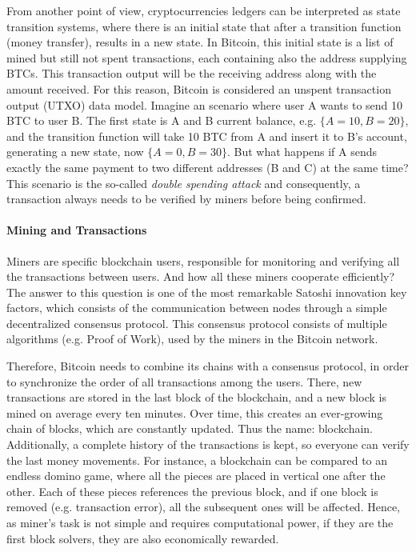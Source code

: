 From another point of view, cryptocurrencies ledgers can be interpreted as state transition systems, where there is an initial state that after a transition function (money transfer), results in a new state. In Bitcoin, this initial state is a list of mined but still not spent transactions, each containing also the address supplying BTCs. This transaction output will be the receiving address along with the amount received. For this reason, Bitcoin is considered an unspent transaction output (UTXO) data model. Imagine an scenario where user A wants to send 10 BTC to user B. The first state is A and B current balance, e.g. $\{A = 10, B = 20\}$, and the transition function will take 10 BTC from A and insert it to B's account, generating a new state, now $\{A = 0, B = 30\}$. But what happens if A sends exactly the same payment to two different addresses (B and C) at the same time? This scenario is the so-called \textit{double spending attack} and consequently, a transaction always needs to be verified by miners before being confirmed. 

\paragraph{Mining and Transactions}

Miners are specific blockchain users, responsible for monitoring and verifying all the transactions between users. And how all these miners cooperate efficiently? The answer to this question is one of the most remarkable Satoshi innovation key factors, which consists of the communication between nodes through a simple decentralized consensus protocol. This consensus protocol consists of multiple algorithms (e.g. Proof of Work), used by the miners in the Bitcoin network.

Therefore, Bitcoin needs to combine its chains with a consensus protocol, in order to synchronize the order of all transactions among the users. There, new transactions are stored in the last block of the blockchain, and a new block is mined on average every ten minutes. Over time, this creates an ever-growing chain of blocks, which are constantly updated. Thus the name: blockchain. Additionally, a complete history of the transactions is kept, so everyone can verify the last money movements. For instance, a blockchain can be compared to an endless domino game, where all the pieces are placed in vertical one after the other. Each of these pieces references the previous block, and if one block is removed (e.g. transaction error), all the subsequent ones will be affected. Hence, as miner's task is not simple and requires computational power, if they are the first block solvers, they are also economically rewarded.

